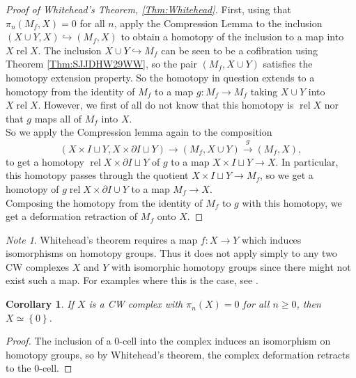 \documentclass[reqno]{amsart}
\newtheorem{corollary}[theorem]{Corollary}
\theoremstyle{definition}
\theoremstyle{remark}
\newtheorem*{note}{Note}
\DeclareMathOperator{\rel}{rel}
\begin{document}
\begin{proof}[Proof of Whitehead's Theorem, \ref{Thm:Whitehead}]
    First, using that 
    $\pi_n \left( M_f, X \right) = 0$ for all $n$, 
    apply the Compression Lemma to
    the inclusion $ \left( X \cup  Y, X \right) 
    \hookrightarrow \left( M_f, X \right) $ to
    obtain a homotopy of the
    inclusion to a map into $X \rel X$.
    The inclusion $X \cup Y \hookrightarrow M_f$ can be
    seen to be a cofibration using 
    Theorem \ref{Thm:SJJDHW29WW}, so
    the pair $\left( M_f, X \cup Y \right) $ satisfies the
    homotopy extension property. So the
    homotopy in question extends to a homotopy
    from the identity of $M_f$ to a
    map $g \colon M_f \to M_f$ taking 
    $X \cup Y$ into $X \rel X$. 
    However, we first of all do not know that this
    homotopy is $\rel X$ nor that 
    $g$ maps all of $M_f$ into $X$.\\
    So we apply the
    Compression lemma again to the
    composition
     \[
         \left( X \times I \sqcup Y,
         X \times \partial I \sqcup Y\right) 
         \to \left( M_f, X \cup Y \right) 
         \stackrel{g}{\to} \left( M_f,X \right) ,
    \]
    to get a homotopy
    $\rel X \times \partial I \sqcup Y$ of
    $g$ to a map 
    $X \times I \sqcup Y \to X$. In particular,
    this homotopy passes through the quotient
    $X \times I \sqcup Y \to M_f$, so we
    get a homotopy of $g \rel X \times \partial I \cup Y$
    to a map $M_f \to X$.\\
    Composing the homotopy
    from the identity of $M_f$ to $g$ with this homotopy,
    we get a deformation retraction of
    $M_f$ onto $X$.
\end{proof}

\begin{note}
    Whitehead's theorem requires a map
    $f \colon X \to Y$ which induces isomorphisms
    on homotopy groups. Thus it does not apply simply
    to any two CW complexes $X$ and $Y$ with isomorphic
    homotopy groups since there might not exist such a map.
    For examples where this is the case, see
    \cite[p. 348]{Hatcher}.
\end{note}

\begin{corollary}
    If $X$ is a CW complex with
    $\pi_n(X) = 0$ for all $n\ge 0$, then
    $X \simeq \left\{ 0 \right\} $.
\end{corollary}

\begin{proof}
    The inclusion of a $0$-cell into the complex
    induces an isomorphism on homotopy
    groups, so by Whitehead's theorem, the complex deformation
    retracts to the $0$-cell.
\end{proof}
\end{document}
